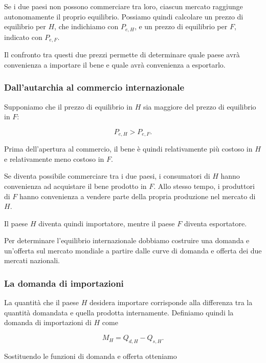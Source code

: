 Se i due paesi non possono commerciare tra loro, ciascun mercato
raggiunge autonomamente il proprio equilibrio. Possiamo quindi
calcolare un prezzo di equilibrio per $H$, che indichiamo con
$P_{e,H}$, e un prezzo di equilibrio per $F$, indicato con
$P_{e,F}$.

Il confronto tra questi due prezzi permette di determinare quale
paese avrà convenienza a importare il bene e quale avrà convenienza
a esportarlo.


\subsubsection{Dall'autarchia al commercio internazionale}

Supponiamo che il prezzo di equilibrio in $H$ sia maggiore del
prezzo di equilibrio in $F$:

\begin{equation*}
    P_{e,H} > P_{e,F}.
    \label{eq:prezzi-autarchia}
\end{equation*}

Prima dell'apertura al commercio, il bene è quindi relativamente
più costoso in $H$ e relativamente meno costoso in $F$.

Se diventa possibile commerciare tra i due paesi, i consumatori
di $H$ hanno convenienza ad acquistare il bene prodotto in $F$.
Allo stesso tempo, i produttori di $F$ hanno convenienza a vendere
parte della propria produzione nel mercato di $H$.

Il paese $H$ diventa quindi importatore, mentre il paese $F$
diventa esportatore.

Per determinare l'equilibrio internazionale dobbiamo costruire
una domanda e un'offerta sul mercato mondiale a partire dalle
curve di domanda e offerta dei due mercati nazionali.


\subsubsection{La domanda di importazioni}

La quantità che il paese $H$ desidera importare corrisponde alla
differenza tra la quantità domandata e quella prodotta internamente.
Definiamo quindi la domanda di importazioni di $H$ come

\begin{equation*}
    M_H = Q_{d,H} - Q_{s,H}.
\end{equation*}

Sostituendo le funzioni di domanda e offerta otteniamo

